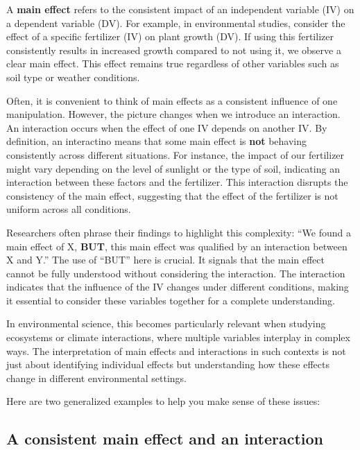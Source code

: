 \documentclass[
  letterpaper,
  DIV=11,
  numbers=noendperiod]{scrreprt}
\begin{document}
A \textbf{main effect} refers to the consistent impact of an independent
variable (IV) on a dependent variable (DV). For example, in
environmental studies, consider the effect of a specific fertilizer (IV)
on plant growth (DV). If using this fertilizer consistently results in
increased growth compared to not using it, we observe a clear main
effect. This effect remains true regardless of other variables such as
soil type or weather conditions.

Often, it is convenient to think of main effects as a consistent
influence of one manipulation. However, the picture changes when we
introduce an interaction. An interaction occurs when the effect of one
IV depends on another IV. By definition, an interactino means that some
main effect is \textbf{not} behaving consistently across different
situations. For instance, the impact of our fertilizer might vary
depending on the level of sunlight or the type of soil, indicating an
interaction between these factors and the fertilizer. This interaction
disrupts the consistency of the main effect, suggesting that the effect
of the fertilizer is not uniform across all conditions.

Researchers often phrase their findings to highlight this complexity:
``We found a main effect of X, \textbf{BUT}, this main effect was
qualified by an interaction between X and Y.'' The use of ``BUT'' here
is crucial. It signals that the main effect cannot be fully understood
without considering the interaction. The interaction indicates that the
influence of the IV changes under different conditions, making it
essential to consider these variables together for a complete
understanding.

In environmental science, this becomes particularly relevant when
studying ecosystems or climate interactions, where multiple variables
interplay in complex ways. The interpretation of main effects and
interactions in such contexts is not just about identifying individual
effects but understanding how these effects change in different
environmental settings.

Here are two generalized examples to help you make sense of these
issues:

\subsection{A consistent main effect and an
interaction}\label{a-consistent-main-effect-and-an-interaction}
\end{document}
